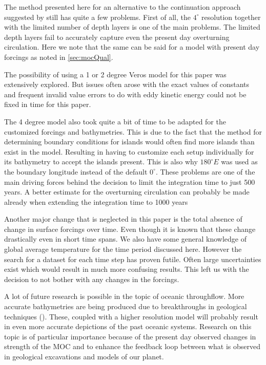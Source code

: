 The method presented here for an alternative to the continuation approach suggested by \cite{Mulder2017Jul} still has quite a few problems. First of all, the $4^{\circ}$ resolution together with the limited number of depth layers is one of the main problems. The limited depth layers fail to accurately capture even the present day overturning circulation. Here we note that the same can be said for a model with present day forcings as noted in \cref{sec:mocQual}.

The possibility of using a 1 or 2 degree Veros model for this paper was extensively explored. But issues often arose with the exact values of constants and frequent invalid value errors to do with eddy kinetic energy could not be fixed in time for this paper.

The 4 degree model also took quite a bit of time to be adapted for the customized forcings and bathymetries. This is due to the fact that the method for determining boundary conditions for islands would often find more islands than exist in the model. Resulting in having to customize each setup individually for its bathymetry to accept the islands present. This is also why $180^{\circ} E$ was used as the boundary longitude instead of the default $0^{\circ}$. These problems are one of the main driving forces behind the decision to limit the integration time to just 500 years. A better estimate for the overturning circulation can probably be made already when extending the integration time to 1000 years

Another major change that is neglected in this paper is the total absence of change in surface forcings over time. Even though it is known that these change drastically even in short time spans. We also have some general knowledge of global average temperature for the time period discussed here. However the search for a dataset for each time step has proven futile. Often large uncertainties exist which would result in much more confusing results. This left us with the decision to not bother with any changes in the forcings.

A lot of future research is possible in the topic of oceanic throughflow. More accurate bathymetries are being produced due to breakthroughs in geological techniques (\cite{Baatsen2016Aug}). These, coupled with a higher resolution model will probably result in even more accurate depictions of the past oceanic systems. Research on this topic is of particular importance because of the present day observed changes in strength of the MOC and to enhance the feedback loop between what is observed in geological excavations and models of our planet.